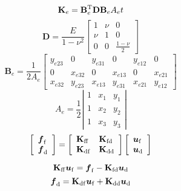 \documentclass[twocolumn]{jarticle}
\def\vector#1{\mbox{\boldmath $#1$}}
\begin{document}
\[
 \mathbf{K}_e = \mathbf{B}_e^{\rm T} \mathbf{D} \mathbf{B}_e A_e t
\]
\[
 \mathbf{D} = \frac{E}{1-\nu^2}
 \left[
 \begin{array}{ccc}
  1 & \nu & 0 \\
  \nu & 1 & 0 \\
  0 & 0 & \displaystyle \frac{1-\nu}{2} 
 \end{array}
 \right]
\]
\[
 \mathbf{B}_e = \frac{1}{2A_e}
 \left[
 \begin{array}{cccccc}
  y_{e23} & 0 & y_{e31} & 0 & y_{e12} & 0 \\
  0 & x_{e32} & 0 & x_{e13} & 0 & x_{e21} \\
  x_{e32} & y_{e23} & x_{e13} & y_{e31} & x_{e21} & y_{e12} 
 \end{array}
 \right]
\]
\[
 A_e = \frac{1}{2}
 \left| 
  \begin{array}{ccc}
   1 & x_1 & y_1 \\
   1 & x_2 & y_2 \\
   1 & x_3 & y_3
  \end{array}
 \right|
\]
\[
\left[
 \begin{array}{l}
  \vector{f}_{\rm f}\\
  \vector{f}_{\rm d}
 \end{array}
\right]
  = 
\left[
 \begin{array}{ll}
  \mathbf{K}_{\rm ff} & \mathbf{K}_{\rm fd}\\
  \mathbf{K}_{\rm df} & \mathbf{K}_{\rm dd}
 \end{array}
\right]
\left[
 \begin{array}{l}
  \vector{u}_{\rm f}\\
  \vector{u}_{\rm d}
 \end{array}
\right]
\]

\[
 \mathbf{K}_{\rm ff} \vector{u}_{\rm f} = \vector{f}_{\rm f} - 
 \mathbf{K}_{\rm fd} \vector{u}_{\rm d}
\]
\[
 \vector{f}_{\rm d} = \mathbf{K}_{\rm df} \vector{u}_{\rm f} + 
 \mathbf{K}_{\rm dd} \vector{u}_{\rm d}
\]
\end{document}
